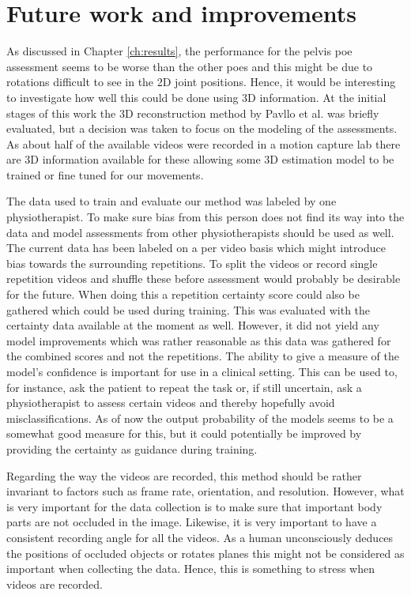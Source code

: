 \section{Future work and improvements}
As discussed in Chapter \ref{ch:results}, the performance for the pelvis \gls{poe} assessment seems to be worse than the other \glspl{poe} and this might be due to rotations difficult to see in the 2D joint positions. Hence, it would be interesting to investigate how well this could be done using 3D information. At the initial stages of this work the 3D reconstruction method by Pavllo et al. \cite{Pavllo2019} was briefly evaluated, but a decision was taken to focus on the modeling of the assessments. As about half of the available videos were recorded in a motion capture lab there are 3D information available for these allowing some 3D estimation model to be trained or fine tuned for our movements.

The data used to train and evaluate our method was labeled by one physiotherapist. To make sure bias from this person does not find its way into the data and model assessments from other physiotherapists should be used as well. The current data has been labeled on a per video basis which might introduce bias towards the surrounding repetitions. To split the videos or record single repetition videos and shuffle these before assessment would probably be desirable for the future. When doing this a repetition certainty score could also be gathered which could be used during training. This was evaluated with the certainty data available at the moment as well. However, it did not yield any model improvements which was rather reasonable as this data was gathered for the combined scores and not the repetitions. The ability to give a measure of the model's confidence is important for use in a clinical setting. This can be used to, for instance, ask the patient to repeat the task or, if still uncertain, ask a physiotherapist to assess certain videos and thereby hopefully avoid misclassifications. As of now the output probability of the models seems to be a somewhat good measure for this, but it could potentially be improved by providing the certainty as guidance during training. %

Regarding the way the videos are recorded, this method should be rather invariant to factors such as frame rate, orientation, and resolution. However, what is very important for the data collection is to make sure that important body parts are not occluded in the image. Likewise, it is very important to have a consistent recording angle for all the videos. As a human unconsciously deduces the positions of occluded objects or rotates planes this might not be considered as important when collecting the data. Hence, this is something to stress when videos are recorded.

